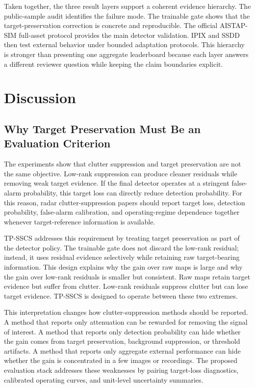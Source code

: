 \documentclass[journal]{IEEEtran}
\begin{document}
Taken together, the three result layers support a coherent evidence hierarchy. The public-sample audit identifies the failure mode. The trainable gate shows that the target-preservation correction is concrete and reproducible. The official AISTAP-SIM full-asset protocol provides the main detector validation. IPIX and SSDD then test external behavior under bounded adaptation protocols. This hierarchy is stronger than presenting one aggregate leaderboard because each layer answers a different reviewer question while keeping the claim boundaries explicit.

\section{Discussion}

\subsection{Why Target Preservation Must Be an Evaluation Criterion}

The experiments show that clutter suppression and target preservation are not the same objective. Low-rank suppression can produce cleaner residuals while removing weak target evidence. If the final detector operates at a stringent false-alarm probability, this target loss can directly reduce detection probability. For this reason, radar clutter-suppression papers should report target loss, detection probability, false-alarm calibration, and operating-regime dependence together whenever target-reference information is available.

TP-SSCS addresses this requirement by treating target preservation as part of the detector policy. The trainable gate does not discard the low-rank residual; instead, it uses residual evidence selectively while retaining raw target-bearing information. This design explains why the gain over raw maps is large and why the gain over low-rank residuals is smaller but consistent. Raw maps retain target evidence but suffer from clutter. Low-rank residuals suppress clutter but can lose target evidence. TP-SSCS is designed to operate between these two extremes.

This interpretation changes how clutter-suppression methods should be reported. A method that reports only attenuation can be rewarded for removing the signal of interest. A method that reports only detection probability can hide whether the gain comes from target preservation, background suppression, or threshold artifacts. A method that reports only aggregate external performance can hide whether the gain is concentrated in a few images or recordings. The proposed evaluation stack addresses these weaknesses by pairing target-loss diagnostics, calibrated operating curves, and unit-level uncertainty summaries.
\end{document}

